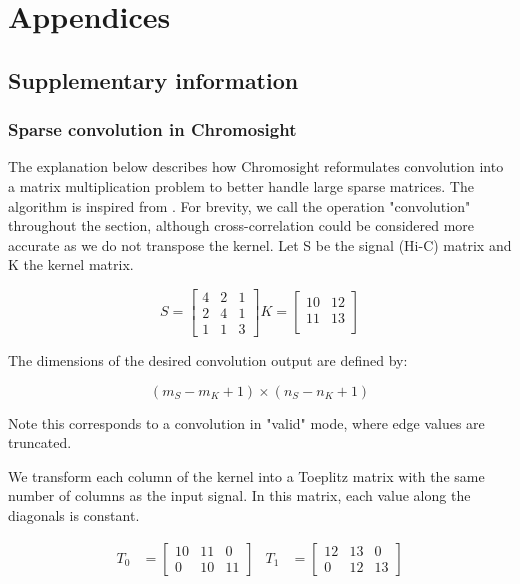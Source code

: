 \ctpartquote{}
\ctparttext{}
\part{Appendices}

\chapter{Supplementary information}
\label{ch:04-A:supdata}

    \section{Sparse convolution in Chromosight}
    \label{sec:04-A-01:convolution}

The explanation below describes how Chromosight reformulates convolution into a matrix multiplication problem to better handle large sparse matrices. The algorithm is inspired from \cite{NeuralNetwork2D}. For brevity, we call the operation "convolution" throughout the section, although cross-correlation could be considered more accurate as we do not transpose the kernel. Let S be the signal (Hi-C) matrix and K the kernel matrix.

\begin{equation}
    S = 
    \begin{bmatrix}
        4 & 2 & 1 \\
        2 & 4 & 1 \\
        1 & 1 & 3
    \end{bmatrix}
    K =
    \begin{bmatrix}
        10 & 12 \\
        11 & 13 \\
    \end{bmatrix}
\end{equation}

The dimensions of the desired convolution output are defined by:

\begin{equation}
    (m_S - m_K + 1) \times (n_S - n_K + 1)
\end{equation}

Note this corresponds to a convolution in "valid" mode, where edge values are truncated.

We transform each column of the kernel into a Toeplitz matrix with the same number of columns as the input signal. In this matrix, each value along the diagonals is constant.

\begin{align}
    T_0 &=
    \begin{bmatrix}
        10 & 11 & 0 \\
        0  & 10 & 11
    \end{bmatrix} &
    T_1 &=
    \begin{bmatrix}
        12 & 13 & 0 \\
        0  & 12 & 13
    \end{bmatrix}
\end{align}

